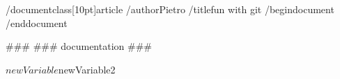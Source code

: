 /documentclass[10pt]{article}
/author{Pietro}
/title{fun with git}
/begin{document}
/end{document}

###
### documentation
###



$newVariable
$newVariable2
